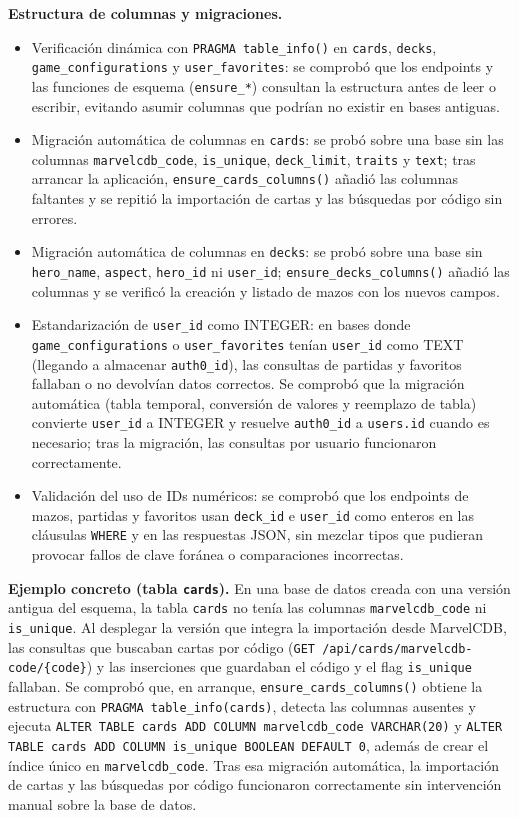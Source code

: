 \textbf{Estructura de columnas y migraciones.}
\begin{itemize}
    \item Verificación dinámica con \texttt{PRAGMA table\_info()} en \texttt{cards}, \texttt{decks}, \texttt{game\_configurations} y \texttt{user\_favorites}: se comprobó que los endpoints y las funciones de esquema (\texttt{ensure\_*}) consultan la estructura antes de leer o escribir, evitando asumir columnas que podrían no existir en bases antiguas.
    \item Migración automática de columnas en \texttt{cards}: se probó sobre una base sin las columnas \texttt{marvelcdb\_code}, \texttt{is\_unique}, \texttt{deck\_limit}, \texttt{traits} y \texttt{text}; tras arrancar la aplicación, \texttt{ensure\_cards\_columns()} añadió las columnas faltantes y se repitió la importación de cartas y las búsquedas por código sin errores.
    \item Migración automática de columnas en \texttt{decks}: se probó sobre una base sin \texttt{hero\_name}, \texttt{aspect}, \texttt{hero\_id} ni \texttt{user\_id}; \texttt{ensure\_decks\_columns()} añadió las columnas y se verificó la creación y listado de mazos con los nuevos campos.
    \item Estandarización de \texttt{user\_id} como INTEGER: en bases donde \texttt{game\_configurations} o \texttt{user\_favorites} tenían \texttt{user\_id} como TEXT (llegando a almacenar \texttt{auth0\_id}), las consultas de partidas y favoritos fallaban o no devolvían datos correctos. Se comprobó que la migración automática (tabla temporal, conversión de valores y reemplazo de tabla) convierte \texttt{user\_id} a INTEGER y resuelve \texttt{auth0\_id} a \texttt{users.id} cuando es necesario; tras la migración, las consultas por usuario funcionaron correctamente.
    \item Validación del uso de IDs numéricos: se comprobó que los endpoints de mazos, partidas y favoritos usan \texttt{deck\_id} e \texttt{user\_id} como enteros en las cláusulas \texttt{WHERE} y en las respuestas JSON, sin mezclar tipos que pudieran provocar fallos de clave foránea o comparaciones incorrectas.
\end{itemize}

\textbf{Ejemplo concreto (tabla \texttt{cards}).} En una base de datos creada con una versión antigua del esquema, la tabla \texttt{cards} no tenía las columnas \texttt{marvelcdb\_code} ni \texttt{is\_unique}. Al desplegar la versión que integra la importación desde MarvelCDB, las consultas que buscaban cartas por código (\texttt{GET /api/cards/marvelcdb-code/\{code\}}) y las inserciones que guardaban el código y el flag \texttt{is\_unique} fallaban. Se comprobó que, en arranque, \texttt{ensure\_cards\_columns()} obtiene la estructura con \texttt{PRAGMA table\_info(cards)}, detecta las columnas ausentes y ejecuta \texttt{ALTER TABLE cards ADD COLUMN marvelcdb\_code VARCHAR(20)} y \texttt{ALTER TABLE cards ADD COLUMN is\_unique BOOLEAN DEFAULT 0}, además de crear el índice único en \texttt{marvelcdb\_code}. Tras esa migración automática, la importación de cartas y las búsquedas por código funcionaron correctamente sin intervención manual sobre la base de datos.

